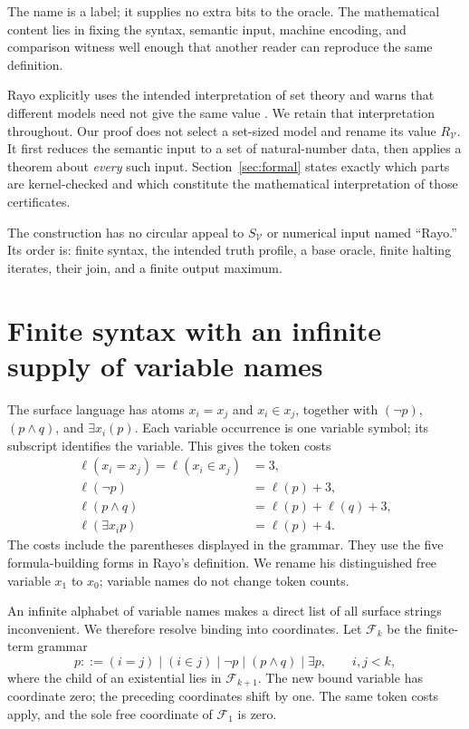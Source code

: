 \documentclass[11pt]{article}
\newcommand{\V}{\mathcal V}
\newcommand{\F}{\mathcal F}
\begin{document}
The name is a label; it supplies no extra bits to the oracle. The mathematical
content lies in fixing the syntax, semantic input, machine encoding, and
comparison witness well enough that another reader can reproduce the same
definition.

Rayo explicitly uses the intended interpretation of set theory and warns that
different models need not give the same value \cite{rayo}. We retain that
interpretation throughout. Our proof does not select a set-sized model and
rename its value $R_{\V}$. It first reduces the semantic input to a set of
natural-number data, then applies a theorem about \emph{every} such input.
Section~\ref{sec:formal} states exactly which parts are kernel-checked and
which constitute the mathematical interpretation of those certificates.

The construction has no circular appeal to $S_{\V}$ or numerical input named
``Rayo.'' Its order is: finite syntax, the intended truth profile, a base
oracle, finite halting iterates, their join, and a finite output maximum.

\section{Finite syntax with an infinite supply of variable names}

The surface language has atoms $x_i=x_j$ and $x_i\in x_j$, together with
$(\neg p)$, $(p\wedge q)$, and $\exists x_i(p)$. Each variable occurrence is
one variable symbol; its subscript identifies the variable. This gives the
token costs
\begin{align*}
 \ell(x_i=x_j)=\ell(x_i\in x_j)&=3,\\
 \ell(\neg p)&=\ell(p)+3,\\
 \ell(p\wedge q)&=\ell(p)+\ell(q)+3,\\
 \ell(\exists x_i p)&=\ell(p)+4.
\end{align*}
The costs include the parentheses displayed in the grammar. They use the
five formula-building forms in Rayo's definition. We rename his distinguished
free variable $x_1$ to $x_0$; variable names do not change token counts.

An infinite alphabet of variable names makes a direct list of all surface
strings inconvenient. We therefore resolve binding into coordinates. Let
$\F_k$ be the finite-term grammar
\[
 p ::= (i=j)\mid(i\in j)\mid\neg p\mid(p\wedge q)\mid\exists p,
 \qquad i,j<k,
\]
where the child of an existential lies in $\F_{k+1}$. The new bound variable
has coordinate zero; the preceding coordinates shift by one. The same token
costs apply, and the sole free coordinate of $\F_1$ is zero.
\end{document}
